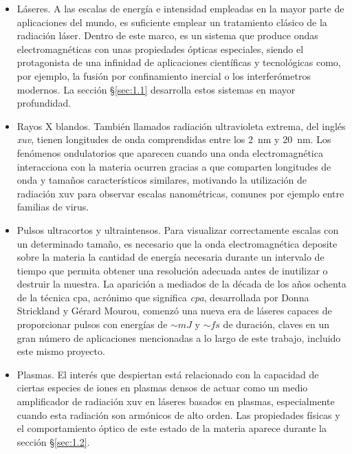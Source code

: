 \begin{itemize}

  \item Láseres. A las escalas de energía e intensidad empleadas en la mayor parte de aplicaciones del mundo, es suficiente emplear un tratamiento clásico de la radiación láser. Dentro de este marco, es un sistema que produce ondas electromagnéticas con unas propiedades ópticas especiales, siendo el protagonista de una infinidad de aplicaciones científicas y tecnológicas como, por ejemplo, la fusión por confinamiento inercial o los interferómetros modernos. La sección \S\ref{sec:1.1} desarrolla estos sistemas en mayor profundidad.
  \item Rayos X blandos. También llamados radiación ultravioleta extrema, del inglés \emph{\acrfull{xuv}}, tienen longitudes de onda comprendidas entre los \qty{2}{nm} y \qty{20}{nm}. Los fenómenos ondulatorios que aparecen cuando una onda electromagnética interacciona con la materia ocurren gracias a que comparten longitudes de onda y tamaños característicos similares, motivando la utilización de radiación \acrshort{xuv} para observar escalas nanométricas, comunes por ejemplo entre familias de virus.
  \item Pulsos ultracortos y ultraintensos. Para visualizar correctamente escalas con un determinado tamaño, es necesario que la onda electromagnética deposite sobre la materia la cantidad de energía necesaria durante un intervalo de tiempo que permita obtener una resolución adecuada antes de inutilizar o destruir la muestra. La aparición a mediados de la década de los años ochenta de la técnica \acrshort{cpa}, acrónimo que significa \emph{\acrlong{cpa}}, desarrollada por Donna Strickland y Gérard Mourou\autocite{Strickland1985}, comenzó una nueva era de láseres capaces de proporcionar pulsos con energías de $\sim\unit{mJ}$ y $\sim\unit{fs}$ de duración, claves en un gran número de aplicaciones mencionadas a lo largo de este trabajo, incluido este mismo proyecto.
  \item Plasmas. El interés que despiertan está relacionado con la capacidad de ciertas especies de iones en plasmas densos de actuar como un medio amplificador de radiación \acrshort{xuv} en láseres basados en plasmas, especialmente cuando esta radiación son armónicos de alto orden. Las propiedades físicas y el comportamiento óptico de este estado de la materia aparece durante la sección \S\ref{sec:1.2}. 

\end{itemize}
